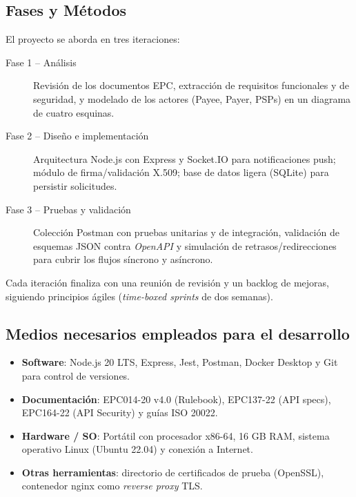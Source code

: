 \subsection{Fases y Métodos}
\label{subsec:FasesMetodos}
El proyecto se aborda en tres iteraciones:
\begin{description}
  \item[Fase 1 – Análisis] Revisión de los documentos EPC, extracción de requisitos funcionales y de seguridad, y modelado de los actores (Payee, Payer, PSPs) en un diagrama de cuatro esquinas.
  \item[Fase 2 – Diseño e implementación] Arquitectura Node.js con Express y Socket.IO para notificaciones push; módulo de firma/validación X.509; base de datos ligera (SQLite) para persistir solicitudes.
  \item[Fase 3 – Pruebas y validación] Colección Postman con pruebas unitarias y de integración, validación de esquemas JSON contra \textit{OpenAPI} y simulación de retrasos/redirecciones para cubrir los flujos síncrono y asíncrono.
\end{description}
Cada iteración finaliza con una reunión de revisión y un backlog de mejoras, siguiendo principios ágiles (\emph{time-boxed sprints} de dos semanas).

\subsection{Medios necesarios empleados para el desarrollo}
\label{subsec:Medios}
\begin{itemize}
  \item \textbf{Software}: Node.js 20 LTS, Express, Jest, Postman, Docker Desktop y Git para control de versiones.
  \item \textbf{Documentación}: EPC014-20 v4.0 (Rulebook), EPC137-22 (API specs), EPC164-22 (API Security) y guías ISO 20022.
  \item \textbf{Hardware / SO}: Portátil con procesador x86-64, 16 GB RAM, sistema operativo Linux (Ubuntu 22.04) y conexión a Internet.
  \item \textbf{Otras herramientas}: directorio de certificados de prueba (OpenSSL), contenedor nginx como \emph{reverse proxy} TLS.
\end{itemize}

